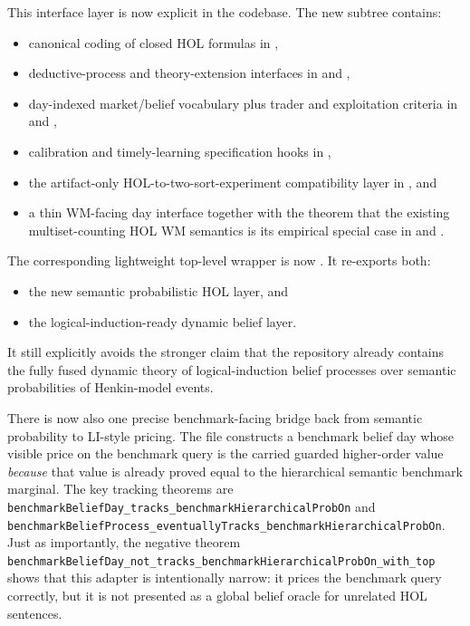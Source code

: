 \documentclass[11pt,openany]{report}
\begin{document}
This interface layer is now explicit in the codebase.  The new subtree
 contains:
\begin{itemize}
\item canonical coding of closed HOL formulas in
  ,
\item deductive-process and theory-extension interfaces in
   and
  ,
\item day-indexed market/belief vocabulary plus trader and exploitation
  criteria in
   and
  ,
\item calibration and timely-learning specification hooks in
  ,
\item the artifact-only HOL-to-two-sort-experiment compatibility layer in
  , and
\item a thin WM-facing day interface together with the theorem that the
  existing multiset-counting HOL WM semantics is its empirical special case in
   and
  .
\end{itemize}

The corresponding lightweight top-level wrapper is now
.  It re-exports both:
\begin{itemize}
\item the new semantic probabilistic HOL layer, and
\item the logical-induction-ready dynamic belief layer.
\end{itemize}
It still explicitly avoids the stronger claim that the repository already
contains the fully fused dynamic theory of logical-induction belief processes
over semantic probabilities of Henkin-model events.

There is now also one precise benchmark-facing bridge back from semantic
probability to LI-style pricing.  The file
constructs a benchmark belief day whose visible price on the benchmark query is
the carried guarded higher-order value \emph{because} that value is already
proved equal to the hierarchical semantic benchmark marginal.  The key tracking
theorems are
\texttt{benchmarkBeliefDay\_tracks\_benchmarkHierarchicalProbOn} and
\texttt{benchmarkBeliefProcess\_eventuallyTracks\_benchmarkHierarchicalProbOn}.
Just as importantly, the negative theorem
\texttt{benchmarkBeliefDay\_not\_tracks\_benchmarkHierarchicalProbOn\_with\_top}
shows that this adapter is intentionally narrow: it prices the benchmark query
correctly, but it is not presented as a global belief oracle for unrelated HOL
sentences.
\end{document}
